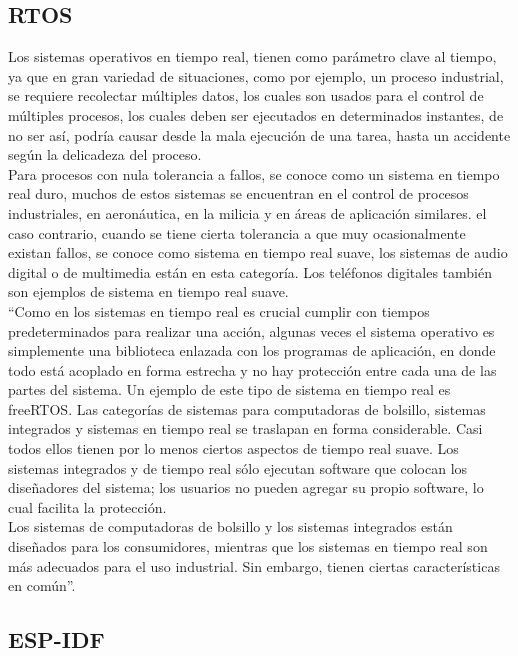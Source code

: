 \subsection{RTOS}

Los sistemas operativos en tiempo real, tienen como parámetro clave al tiempo, ya que en gran variedad de situaciones, como por ejemplo, un proceso industrial, se requiere recolectar múltiples datos, los cuales son usados para el control de múltiples procesos, los cuales deben ser ejecutados en determinados instantes, de no ser así, podría causar desde la mala ejecución de una tarea, hasta un accidente según la delicadeza del proceso.\\ 

Para procesos con nula tolerancia a fallos, se conoce como un sistema en tiempo real duro, muchos de estos sistemas se encuentran en el control de procesos industriales, en aeronáutica, en la milicia y en áreas de aplicación similares. el caso contrario, cuando se tiene cierta tolerancia a que muy ocasionalmente existan fallos, se conoce como sistema en tiempo real suave, los sistemas de audio digital o de multimedia están en esta categoría. Los teléfonos digitales también son ejemplos de sistema en tiempo real suave. \cite{SO} \\

``Como en los sistemas en tiempo real es crucial cumplir con tiempos predeterminados para realizar una acción, algunas veces el sistema operativo es simplemente una biblioteca enlazada con los programas de aplicación, en donde todo está acoplado en forma estrecha y no hay protección entre cada una de las partes del sistema. Un ejemplo de este tipo de sistema en tiempo real es freeRTOS.  Las categorías de sistemas para computadoras de bolsillo, sistemas integrados y sistemas en tiempo real se traslapan en forma considerable. Casi todos ellos tienen por lo menos ciertos aspectos de tiempo real suave. Los sistemas integrados y de tiempo real sólo ejecutan software que colocan los diseñadores del sistema; los usuarios no pueden agregar su propio software, lo cual facilita la protección. \\

Los sistemas de computadoras de bolsillo y los sistemas integrados están diseñados para los consumidores, mientras que los sistemas en tiempo real son más adecuados para el uso industrial. Sin embargo, tienen ciertas características en común''. \cite{SO}\\

\subsection{ESP-IDF}

